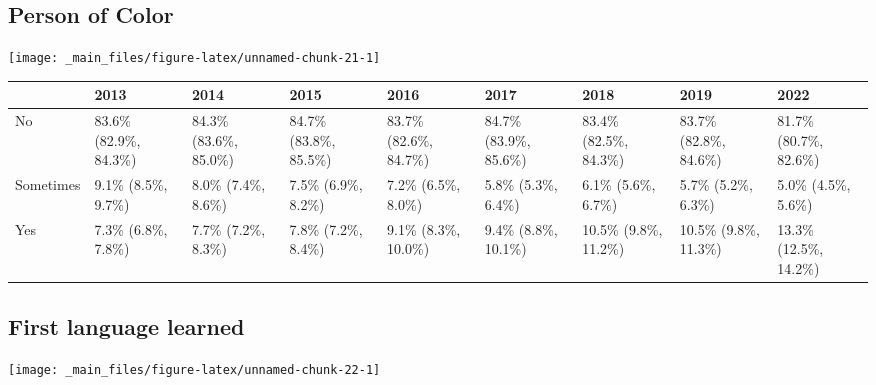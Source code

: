 \documentclass[
]{book}
\begin{document}
\hypertarget{person-of-color}{%
\subsection{Person of Color}\label{person-of-color}}

\texttt{[image: \_main\_files/figure-latex/unnamed-chunk-21-1]}

\begin{table}
\centering
\begin{tabular}[t]{>{}l|>{}l|>{}l|>{}l|>{}l|>{}l|>{}l|>{}l|>{}l}
\hline
  & 2013 & 2014 & 2015 & 2016 & 2017 & 2018 & 2019 & 2022\\
\hline
No & 83.6\% (82.9\%, 84.3\%) & 84.3\% (83.6\%, 85.0\%) & 84.7\% (83.8\%, 85.5\%) & 83.7\% (82.6\%, 84.7\%) & 84.7\% (83.9\%, 85.6\%) & 83.4\% (82.5\%, 84.3\%) & 83.7\% (82.8\%, 84.6\%) & 81.7\% (80.7\%, 82.6\%)\\
\hline
Sometimes & 9.1\% (8.5\%, 9.7\%) & 8.0\% (7.4\%, 8.6\%) & 7.5\% (6.9\%, 8.2\%) & 7.2\% (6.5\%, 8.0\%) & 5.8\% (5.3\%, 6.4\%) & 6.1\% (5.6\%, 6.7\%) & 5.7\% (5.2\%, 6.3\%) & 5.0\% (4.5\%, 5.6\%)\\
\hline
Yes & 7.3\% (6.8\%, 7.8\%) & 7.7\% (7.2\%, 8.3\%) & 7.8\% (7.2\%, 8.4\%) & 9.1\% (8.3\%, 10.0\%) & 9.4\% (8.8\%, 10.1\%) & 10.5\% (9.8\%, 11.2\%) & 10.5\% (9.8\%, 11.3\%) & 13.3\% (12.5\%, 14.2\%)\\
\hline
\end{tabular}
\end{table}

\hypertarget{first-language-learned}{%
\subsection{First language learned}\label{first-language-learned}}

\texttt{[image: \_main\_files/figure-latex/unnamed-chunk-22-1]}
\end{document}
